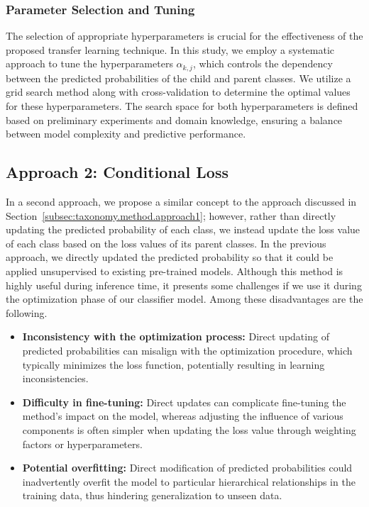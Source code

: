 \documentclass[authoryear,preprint,review,12pt]{elsarticle}
\begin{document}
\subsubsection{Parameter Selection and Tuning}
The selection of appropriate hyperparameters is crucial for the effectiveness of the proposed transfer learning technique. In this study, we employ a systematic approach to tune the hyperparameters $\alpha_{k,j} $, which controls the dependency between the predicted probabilities of the child and parent classes. We utilize a grid search method along with cross-validation to determine the optimal values for these hyperparameters. The search space for both hyperparameters is defined based on preliminary experiments and domain knowledge, ensuring a balance between model complexity and predictive performance.
\subsection{Approach 2: Conditional Loss}\label{subsec:taxonomy.method.approach2}
In a second approach, we propose a similar concept to the approach discussed in Section~\ref{subsec:taxonomy.method.approach1}; however, rather than directly updating the predicted probability of each class, we instead update the loss value of each class based on the loss values of its parent classes. In the previous approach, we directly updated the predicted probability so that it could be applied unsupervised to existing pre-trained models. Although this method is highly useful during inference time, it presents some challenges if we use it during the optimization phase of our classifier model. Among these disadvantages are the following.
\begin{itemize}
    \item \textbf{Inconsistency with the optimization process:} Direct updating of predicted probabilities can misalign with the optimization procedure, which typically minimizes the loss function, potentially resulting in learning inconsistencies.
    \item \textbf{Difficulty in fine-tuning:} Direct updates can complicate fine-tuning the method's impact on the model, whereas adjusting the influence of various components is often simpler when updating the loss value through weighting factors or hyperparameters.
    \item \textbf{Potential overfitting:} Direct modification of predicted probabilities could inadvertently overfit the model to particular hierarchical relationships in the training data, thus hindering generalization to unseen data.
\end{itemize}
\end{document}
